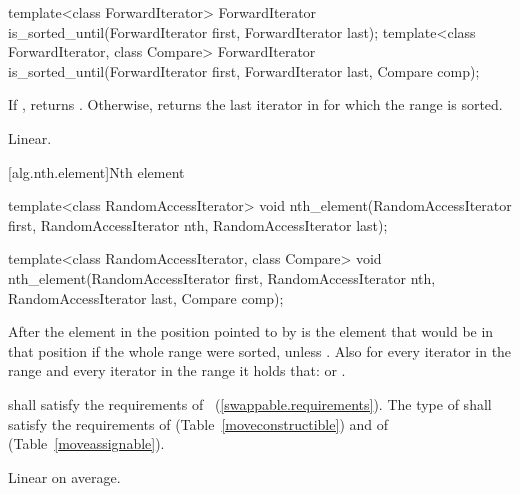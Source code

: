 \begin{itemdescr}
\pnum
\returns {}
\end{itemdescr}

%
\begin{itemdecl}
template<class ForwardIterator>
  ForwardIterator is_sorted_until(ForwardIterator first, ForwardIterator last);
template<class ForwardIterator, class Compare>
  ForwardIterator is_sorted_until(ForwardIterator first, ForwardIterator last,
    Compare comp);
\end{itemdecl}


\begin{itemdescr}
\pnum
\returns If , returns
. Otherwise, returns
the last iterator  in  for which the
range  is sorted.

\pnum
\complexity Linear.
\end{itemdescr}

[alg.nth.element]{Nth element}

%
\begin{itemdecl}
template<class RandomAccessIterator>
  void nth_element(RandomAccessIterator first, RandomAccessIterator nth,
                   RandomAccessIterator last);

template<class RandomAccessIterator, class Compare>
  void nth_element(RandomAccessIterator first, RandomAccessIterator nth,
                   RandomAccessIterator last,  Compare comp);
\end{itemdecl}

\begin{itemdescr}
\pnum
After
the element in the position pointed to by 
is the element that would be
in that position if the whole range were sorted, unless .
Also for every iterator
in the range
and every iterator
in the range
it holds that:
or
.

\pnum
\requires
{} shall satisfy the requirements of
~(\ref{swappable.requirements}). The type
of  shall satisfy the requirements of
 (Table~\ref{moveconstructible}) and of
 (Table~\ref{moveassignable}).


\pnum
\complexity
Linear on average.
\end{itemdescr}

